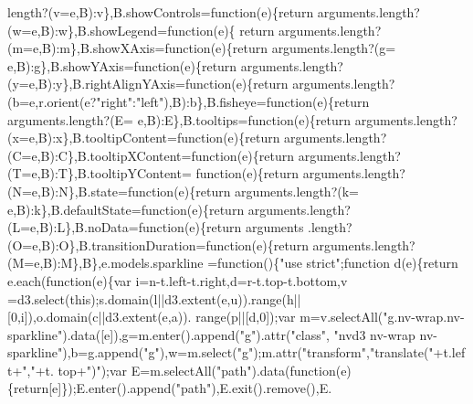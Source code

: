 \begin{DoxyCode}
      length?(v=e,B):v\},B.showControls=\textcolor{keyword}{function}(e)\{\textcolor{keywordflow}{return} arguments.length?(w=e,B):w\},B.showLegend=\textcolor{keyword}{function}(e)\{\textcolor{keywordflow}{
      return} arguments.length?(m=e,B):m\},B.showXAxis=\textcolor{keyword}{function}(e)\{\textcolor{keywordflow}{return} arguments.length?(g=
      e,B):g\},B.showYAxis=\textcolor{keyword}{function}(e)\{\textcolor{keywordflow}{return} arguments.length?(y=e,B):y\},B.rightAlignYAxis=\textcolor{keyword}{function}(e)\{\textcolor{keywordflow}{return} 
      arguments.length?(b=e,r.orient(e?\textcolor{stringliteral}{"right"}:\textcolor{stringliteral}{"left"}),B):b\},B.fisheye=\textcolor{keyword}{function}(e)\{\textcolor{keywordflow}{return} arguments.length?(E=
      e,B):E\},B.tooltips=\textcolor{keyword}{function}(e)\{\textcolor{keywordflow}{return} arguments.length?(x=e,B):x\},B.tooltipContent=\textcolor{keyword}{function}(e)\{\textcolor{keywordflow}{return} 
      arguments.length?(C=e,B):C\},B.tooltipXContent=\textcolor{keyword}{function}(e)\{\textcolor{keywordflow}{return} arguments.length?(T=e,B):T\},B.tooltipYContent=\textcolor{keyword}{
      function}(e)\{\textcolor{keywordflow}{return} arguments.length?(N=e,B):N\},B.state=\textcolor{keyword}{function}(e)\{\textcolor{keywordflow}{return} arguments.length?(k=
      e,B):k\},B.defaultState=\textcolor{keyword}{function}(e)\{\textcolor{keywordflow}{return} arguments.length?(L=e,B):L\},B.noData=\textcolor{keyword}{function}(e)\{\textcolor{keywordflow}{return} arguments
      .length?(O=e,B):O\},B.transitionDuration=\textcolor{keyword}{function}(e)\{\textcolor{keywordflow}{return} arguments.length?(M=e,B):M\},B\},e.models.sparkline
      =\textcolor{keyword}{function}()\{\textcolor{stringliteral}{"use strict"};\textcolor{keyword}{function} d(e)\{\textcolor{keywordflow}{return} e.each(\textcolor{keyword}{function}(e)\{var i=n-t.left-t.right,d=r-t.top-t.bottom,v
      =d3.select(\textcolor{keyword}{this});s.domain(l||d3.extent(e,u)).range(h||[0,i]),o.domain(c||d3.extent(e,a)).
      range(p||[d,0]);var m=v.selectAll(\textcolor{stringliteral}{"g.nv-wrap.nv-sparkline"}).data([e]),g=m.enter().append(\textcolor{stringliteral}{"g"}).attr(\textcolor{stringliteral}{"class"},\textcolor{stringliteral}{
      "nvd3 nv-wrap nv-sparkline"}),b=g.append(\textcolor{stringliteral}{"g"}),w=m.select(\textcolor{stringliteral}{"g"});m.attr(\textcolor{stringliteral}{"transform"},\textcolor{stringliteral}{"translate("}+t.left+\textcolor{stringliteral}{","}+t.
      top+\textcolor{stringliteral}{")"});var E=m.selectAll(\textcolor{stringliteral}{"path"}).data(\textcolor{keyword}{function}(e)\{\textcolor{keywordflow}{return}[e]\});E.enter().append(\textcolor{stringliteral}{"path"}),E.exit().remove(),E.

\end{DoxyCode}
